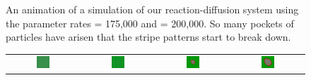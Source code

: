\begin{figure}[h]
\begin{tabular}{c c c c}
\end{tabular}
\caption{An animation of a simulation of our reaction-diffusion system using the parameter rates  = 175,000 and  = 200,000. So many pockets of  particles have arisen that the stripe patterns start to break down.}
\label{fig:k=200000_f=175000}
\end{figure}

\begin{figure}[h]
\centering
\mySfFamily
\begin{tabular}{c c c c}
\includegraphics[width = 0.19\textwidth]{../images/predator_prey_11_by_11_f_1_k_1.png} & \includegraphics[width = 0.19\textwidth]{../images/../images/predator_prey_11_by_11_f_1_k_1_i1.png} & \includegraphics[width = 0.19\textwidth]{../images/../images/predator_prey_11_by_11_f_1_k_1_i2.png} & \includegraphics[width = 0.19\textwidth]{../images/../images/predator_prey_11_by_11_f_1_k_1_i3.png}\\[2ex]

\end{tabular}
\end{figure}
